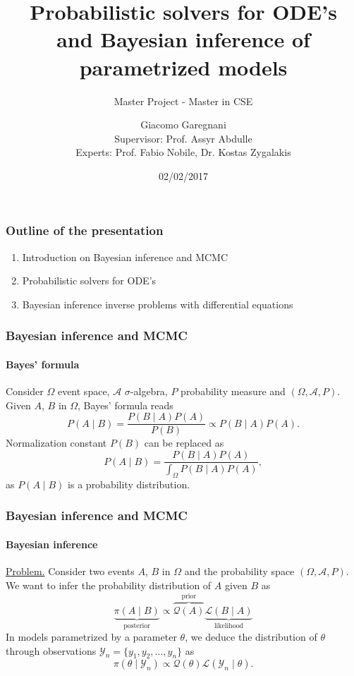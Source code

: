 \documentclass{beamer}
\title{Probabilistic solvers for ODE's \\ and Bayesian inference of parametrized models}
\subtitle{Master Project - Master in CSE}
\author{Giacomo Garegnani \\ Supervisor: Prof. Assyr Abdulle \\ Experts: Prof. Fabio Nobile, Dr. Kostas Zygalakis}
\institute{EPFL}
\date{02/02/2017}
\begin{document}
\frame{\titlepage}

\begin{frame}
	\frametitle{Outline of the presentation}
	\begin{enumerate}
		\item Introduction on Bayesian inference and MCMC
		\item Probabilistic solvers for ODE's
		\item Bayesian inference inverse problems with differential equations
	\end{enumerate}
\end{frame}


\begin{frame}
	\frametitle{Bayesian inference and MCMC}
	\framesubtitle{Bayes' formula}
	
	Consider $\Omega$ event space, $\mathcal{A}$  $\sigma$-algebra, $P$ probability measure and $(\Omega, \mathcal{A}, P)$. Given $A$, $B$ in $\Omega$, Bayes' formula reads 
	\begin{equation*}
		P(A\mid B) = \frac{P(B\mid A)P(A)}{P(B)} \propto P(B\mid A)P(A).
	\end{equation*}
	Normalization constant $P(B)$ can be replaced as
	\begin{equation*}
		P(A\mid B) = \frac{P(B\mid A)P(A)}{\int_{\Omega}P(B\mid A)P(A)},
	\end{equation*}
	as $P(A\mid B)$ is a probability distribution.
\end{frame}

\begin{frame}
	\frametitle{Bayesian inference and MCMC}
	\framesubtitle{Bayesian inference}
	
	\underline{Problem.} Consider two events $A$, $B$ in $\Omega$ and the probability space $(\Omega, \mathcal{A}, P)$. We want to infer the probability distribution of $A$ given $B$ as
	\begin{equation*}
		\underbrace{\pi(A\mid B)}_{\text{posterior}} \propto \overbrace{\mathcal{Q}(A)}^{\text{prior}} \underbrace{\mathcal{L}(B \mid A)}_{\text{likelihood}}
	\end{equation*}
	In models parametrized by a parameter $\theta$, we deduce the distribution of $\theta$ through observations $\mathcal{Y}_n = \{y_1, y_2, \ldots, y_n\}$ as
	\begin{equation*}
		\pi(\theta\mid\mathcal{Y}_n) \propto \mathcal{Q}(\theta) \mathcal{L}(\mathcal{Y}_n \mid \theta).
	\end{equation*}
\end{frame}
\end{document}

